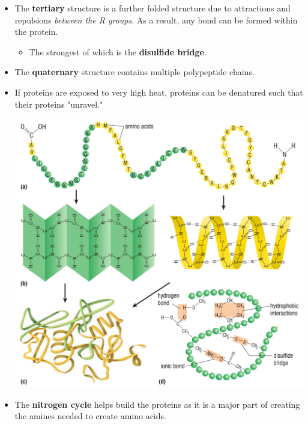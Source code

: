 \documentclass[letterpaper]{article}
\numberwithin{equation}{section}
\theoremstyle{classic}
\begin{document}
\begin{itemize}
    \item The \textbf{tertiary} structure is a further folded structure due to attractions and repulsions \textit{between the R groups}. As a result, any bond can be formed within the protein.
    \begin{itemize}
        \item The strongest of which is the \textbf{disulfide bridge}.
    \end{itemize}
    \item The \textbf{quaternary} structure contains multiple polypeptide chains.
    \item If proteins are exposed to very high heat, proteins can be denatured such that their proteins "unravel."
    \begin{center}\includegraphics[width=0.75\linewidth]{A9.PNG}\end{center}
    \item The \textbf{nitrogen cycle} helps build the proteins as it is a major part of creating the amines needed to create amino acids.


\end{itemize}
\end{document}
